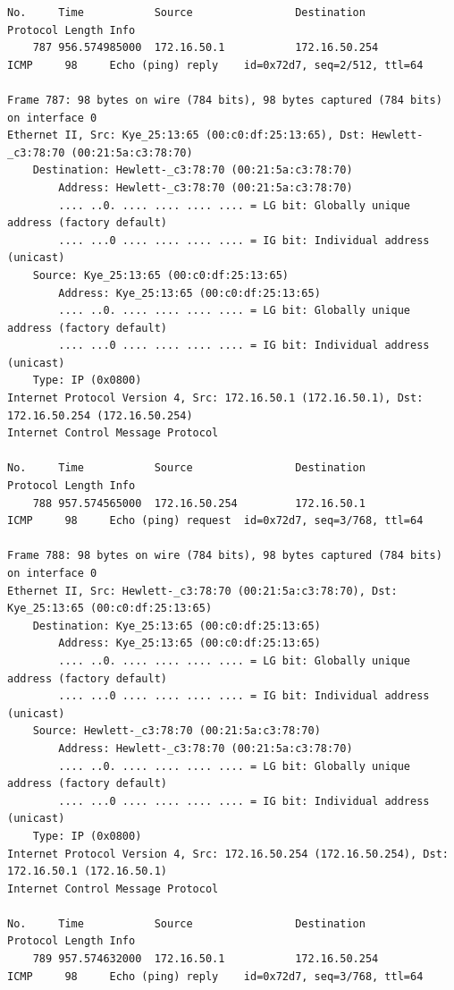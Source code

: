 \documentclass[a4paper,11pt]{article}
\begin{document}
\begin{lstlisting}
No.     Time           Source                Destination           Protocol Length Info
    787 956.574985000  172.16.50.1           172.16.50.254         ICMP     98     Echo (ping) reply    id=0x72d7, seq=2/512, ttl=64

Frame 787: 98 bytes on wire (784 bits), 98 bytes captured (784 bits) on interface 0
Ethernet II, Src: Kye_25:13:65 (00:c0:df:25:13:65), Dst: Hewlett-_c3:78:70 (00:21:5a:c3:78:70)
    Destination: Hewlett-_c3:78:70 (00:21:5a:c3:78:70)
        Address: Hewlett-_c3:78:70 (00:21:5a:c3:78:70)
        .... ..0. .... .... .... .... = LG bit: Globally unique address (factory default)
        .... ...0 .... .... .... .... = IG bit: Individual address (unicast)
    Source: Kye_25:13:65 (00:c0:df:25:13:65)
        Address: Kye_25:13:65 (00:c0:df:25:13:65)
        .... ..0. .... .... .... .... = LG bit: Globally unique address (factory default)
        .... ...0 .... .... .... .... = IG bit: Individual address (unicast)
    Type: IP (0x0800)
Internet Protocol Version 4, Src: 172.16.50.1 (172.16.50.1), Dst: 172.16.50.254 (172.16.50.254)
Internet Control Message Protocol

No.     Time           Source                Destination           Protocol Length Info
    788 957.574565000  172.16.50.254         172.16.50.1           ICMP     98     Echo (ping) request  id=0x72d7, seq=3/768, ttl=64

Frame 788: 98 bytes on wire (784 bits), 98 bytes captured (784 bits) on interface 0
Ethernet II, Src: Hewlett-_c3:78:70 (00:21:5a:c3:78:70), Dst: Kye_25:13:65 (00:c0:df:25:13:65)
    Destination: Kye_25:13:65 (00:c0:df:25:13:65)
        Address: Kye_25:13:65 (00:c0:df:25:13:65)
        .... ..0. .... .... .... .... = LG bit: Globally unique address (factory default)
        .... ...0 .... .... .... .... = IG bit: Individual address (unicast)
    Source: Hewlett-_c3:78:70 (00:21:5a:c3:78:70)
        Address: Hewlett-_c3:78:70 (00:21:5a:c3:78:70)
        .... ..0. .... .... .... .... = LG bit: Globally unique address (factory default)
        .... ...0 .... .... .... .... = IG bit: Individual address (unicast)
    Type: IP (0x0800)
Internet Protocol Version 4, Src: 172.16.50.254 (172.16.50.254), Dst: 172.16.50.1 (172.16.50.1)
Internet Control Message Protocol

No.     Time           Source                Destination           Protocol Length Info
    789 957.574632000  172.16.50.1           172.16.50.254         ICMP     98     Echo (ping) reply    id=0x72d7, seq=3/768, ttl=64


\end{lstlisting}
\end{document}
